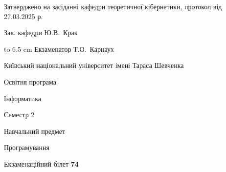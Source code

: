\documentclass[12pt, ukrainian]{article}
\begin{document}
{\smallskip\smallskip \begin {scriptsize} Затверджено на засіданні кафедри теоретичної кібернетики, протокол   від   27.03.2025 р.\par\smallskip\smallskip\smallskip\smallskip
{\parbox {6.5 cm} {Зав. кафедри \dotfill Ю.В.~Крак}}\hspace {0.7cm} {\hbox to 6.5 cm { Екзаменатор \dotfill Т.О.~Карнаух}} \end{scriptsize}}
\newpage
{{\begin {scriptsize}\par
{ \center  Київський національний університет імені Тараса Шевченка \par}
{\parbox {5 cm}{Освітня програма \hfill}{\parbox {7 cm}{Інформатика\hfill}}\parbox {6 cm}{\hfill Семестр 2}}\par
{\parbox {5 cm} {Навчальний предмет \hfill}\parbox {7 cm}{Програмування \hfill}\parbox {6cm}{\hfill}\par}\vspace{-15pt} \end{scriptsize}}{\center Екзаменаційний білет \No \textbf { 74 }\par}}
\end{document}
